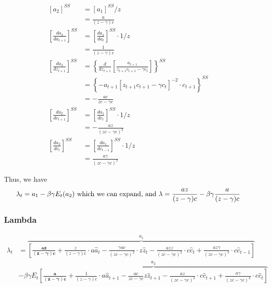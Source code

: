 \documentclass[11pt,preprint, authoryear]{elsarticle}
\numberwithin{equation}{section}
\numberwithin{figure}{section}
\numberwithin{table}{section}
\begin{document}
\[\begin{aligned}
\left[ a_{2} \right]^{SS} &= \left[ a_{1} \right]^{SS} / z\\
&= \frac{a}{(z  -\gamma)c }\\
\left[\frac{da_{2}}{da_{t+1}} \right]^{SS} 
&= \left[\frac{da_{1}}{da_{t}} \right]^{SS} \cdot 1 / z\\
&= \frac{1}{(z  -\gamma)c}\\
\left[\frac{da_{2}}{dz_{t+1}} \right]^{SS} &= \left\{\frac{d}{d z_{t+1}}\left[\frac{a_{t+1}}{z_{t+1} c_{t+1}-\gamma c_{t}}\right]\right\}^{SS}\\
&=\left\{-a_{t+1}\left[z_{t+1} c_{t+1}-\gamma c_t\right]^{-2} \cdot c_{t+1}\right\}^{SS}\\
&= - \frac{a c}{z c-\gamma c}\\
\left[\frac{da_{2}}{dc_{t+1}} \right]^{SS} &= \left[\frac{da_{1}}{dc_{t}} \right]^{SS} \cdot 1 / z \\
&= - \frac {a z} {(z c - \gamma c)^{2}}\\\left[\frac{da_{2}}{dc_{t}} \right]^{SS} &= \left[\frac{da_{1}}{dc_{t-1}} \right]^{SS} \cdot 1 / z\\&= \frac{a \gamma}{(z c-\gamma c)^{2}}
\end{aligned}\]

Thus, we have
\[\lambda_t = a_1 - \beta \gamma E_t (a_2) \text{ which we can expand, and } 
\\
\lambda = \frac{a z}{(z  -\gamma)c } - \beta \gamma \frac{a}{(z-\gamma) c}\]

\hypertarget{lambda}{%
\subsubsection{Lambda}\label{lambda}}

\[\begin{aligned}
\lambda_t &= \overbrace{
\left[ 
\mathbf{\frac{a z}{(z  -\gamma)c }}
+ \frac{z}{(z  -\gamma)c} \cdot a \hat{a}_t 
- \frac{ \gamma a c}{(z c- \gamma c)^{2}} \cdot z \hat{z}_t 
- \frac{a z z}{(z c-\gamma c)^{2}} \cdot c \hat{c}_t
+ \frac{a z \gamma}{(z c-\gamma c)^{2}} \cdot c \hat{c}_{t-1} 
\right]
}^{a_1}\\
&  - \beta \gamma E_t
\overbrace{
\left[
\mathbf{\frac{a}{(z-\gamma) c}}
+ \frac{1}{(z-\gamma) c} \cdot a \hat{a}_{t+1}
- \frac{a c}{z c-\gamma c} z \hat{z}_{t+1}
- \frac{a z}{(z c-\gamma c)^{2}} \cdot c \hat{c}_{t+1}
+ \frac{a \gamma}{(z c-\gamma c)^{2}} \cdot c \hat{c}_t
\right]}^{a_2}
\end{aligned}\]
\end{document}
